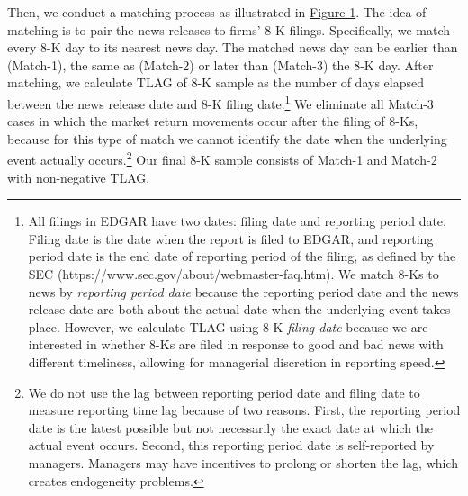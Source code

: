 \documentclass[a4paper]{article}
\begin{document}
\begin{spacing}{2}
Then, we conduct a matching process as illustrated in \hyperref[fig1]{Figure 1}. The idea of matching is to pair the news releases to firms' 8-K filings. Specifically, we match every 8-K day to its nearest news day. The matched news day can be earlier than (Match-1), the same as (Match-2) or later than (Match-3) the 8-K day. After matching, we calculate TLAG of 8-K sample as the number of days elapsed between the news release date and 8-K filing date.\footnote{All filings in EDGAR have two dates: filing date and reporting period date. Filing date is the date when the report is filed to EDGAR, and reporting period date is the end date of reporting period of the filing, as defined by the SEC (https://www.sec.gov/about/webmaster-faq.htm). We match 8-Ks to news by \textit{reporting period date} because the reporting period date and the news release date are both about the actual date when the underlying event takes place. However, we calculate TLAG using 8-K \textit{filing date} because we are interested in whether 8-Ks are filed in response to good and bad news with different timeliness, allowing for managerial discretion in reporting speed.} We eliminate all Match-3 cases in which the market return movements occur after the filing of 8-Ks, because for this type of match we cannot identify the date when the underlying event actually occurs.\footnote{We do not use the lag between reporting period date and filing date to measure reporting time lag because of two reasons. First, the reporting period date is the latest possible but not necessarily the exact date at which the actual event occurs. Second, this reporting period date is self-reported by managers. Managers may have incentives to prolong or shorten the lag, which creates endogeneity problems.} Our final 8-K sample consists of Match-1 and Match-2 with non-negative TLAG.


\end{spacing}
\end{document}
